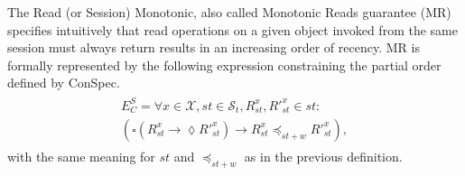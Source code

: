 \documentclass[journal, compsoc]{IEEEtran}
\begin{document}
	The Read (or Session) Monotonic, also called Monotonic Reads guarantee (MR) specifies intuitively that read operations on a given object invoked from the same session must always return results in an increasing order of recency.   MR is formally represented by the following expression constraining the partial order defined by ConSpec.
	\begin{align}\label{eqn:MR}
	\begin{split}
	E^S_C =  \forall x \in \mathcal{X}, \mathit{st} \in \mathcal{S}_t, R_\mathit{st}^x, R'^x_\mathit{st} \in \mathit{st}: \\
	\left( \square \left( R_\mathit{st}^x \rightarrow \lozenge R'^{x}_\mathit{st} \right)
	\rightarrow R_\mathit{st}^x \preccurlyeq_{\mathit{st}+w} R'^{x}_\mathit{st} \right),
	\end{split}
	\end{align} with the same meaning for $\mathit{st}$ and $\preccurlyeq_{\mathit{st}+w}$ as in the previous definition.
	
\end{document}
